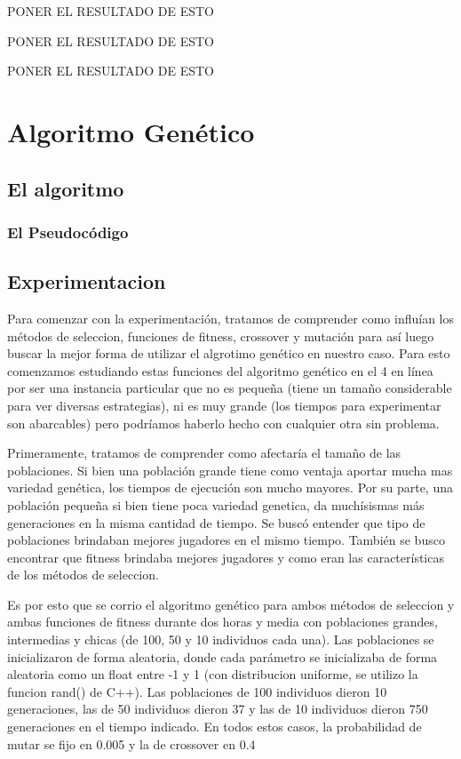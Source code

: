 \documentclass[A4paper,oneside,fleqn,11pt]{article}
\theoremstyle{definition}
\begin{document}
PONER EL RESULTADO DE ESTO

PONER EL RESULTADO DE ESTO

PONER EL RESULTADO DE ESTO








\section{Algoritmo Genético}



\subsection{El algoritmo}

\subsubsection{El Pseudocódigo}



\subsection{Experimentacion}

Para comenzar con la experimentación, tratamos de comprender como influían los métodos de seleccion, funciones de fitness, crossover y mutación para así luego buscar la mejor forma de utilizar el algrotimo genético en nuestro caso. Para esto comenzamos estudiando estas funciones del algoritmo genético en el 4 en línea por ser una instancia particular que no es pequeña (tiene un tamaño considerable para ver diversas estrategias), ni es muy grande (los tiempos para experimentar son abarcables) pero podríamos haberlo hecho con cualquier otra sin problema.


Primeramente, tratamos de comprender como afectaría el tamaño de las poblaciones. Si bien una población grande tiene como ventaja aportar mucha mas variedad genética, los tiempos de ejecución son mucho mayores. Por su parte, una población pequeña si bien tiene poca variedad genetica, da muchísismas más generaciones en la misma cantidad de tiempo. Se buscó entender que tipo de poblaciones brindaban mejores jugadores en el mismo tiempo. También se busco encontrar que fitness brindaba mejores jugadores y como eran las características de los métodos de seleccion.

Es por esto que se corrio el algoritmo genético para ambos métodos de seleccion y ambas funciones de fitness durante dos horas y media con poblaciones grandes, intermedias y chicas (de 100, 50 y 10 individuos cada una). Las poblaciones se inicializaron de forma aleatoria, donde cada parámetro se inicializaba de forma aleatoria como un float entre -1 y 1 (con distribucion uniforme, se utilizo la funcion rand() de C++). Las poblaciones de 100 individuos dieron 10 generaciones, las de 50 individuos dieron 37 y las de 10 individuos dieron 750 generaciones en el tiempo indicado. En todos estos casos, la probabilidad de mutar se fijo en 0.005 y la de crossover en 0.4
\end{document}
